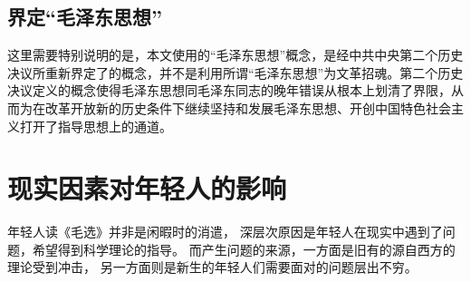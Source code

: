 \documentclass{ctexart}
\begin{document}
\subsection{界定“毛泽东思想”}
这里需要特别说明的是，本文使用的“毛泽东思想”概念，是经中共中央第二个历史决议所重新界定了的概念，并不是利用所谓“毛泽东思想”为文革招魂。第二个历史决议定义的概念使得毛泽东思想同毛泽东同志的晚年错误从根本上划清了界限，从而为在改革开放新的历史条件下继续坚持和发展毛泽东思想、开创中国特色社会主义打开了指导思想上的通道。
\section{现实因素对年轻人的影响}
\label{sec:2}
年轻人读《毛选》并非是闲暇时的消遣，
深层次原因是年轻人在现实中遇到了问题，希望得到科学理论的指导。
而产生问题的来源，一方面是旧有的源自西方的理论受到冲击，
另一方面则是新生的年轻人们需要面对的问题层出不穷。
\end{document}
